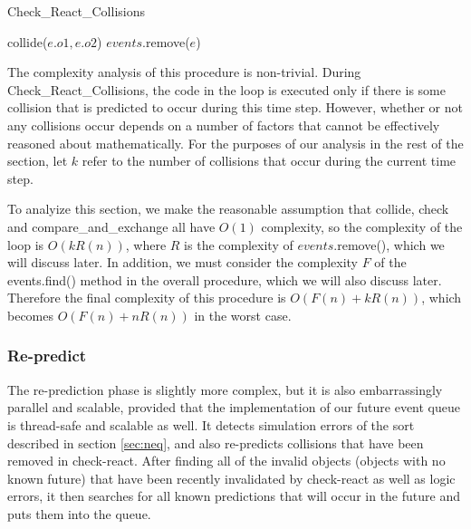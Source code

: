 \documentclass[CEJCS,PDF]{cej} %
\begin{document}
\begin{algorithm}
\caption{Check\_React\_Collisions}
\begin{algorithmic}
\STATE {}
	\STATE {}
		\STATE {}
			\STATE {}
			\STATE collide($e.o1,e.o2$)
		\ENDIF
		\STATE {}
		\STATE $events$.remove($e$)
	\ENDIF
\ENDFOR
\end{algorithmic}
\end{algorithm}

The complexity analysis of this procedure is non-trivial.  During Check\_React\_Collisions, the code in the loop is executed only if there is 
some collision that is predicted to occur during this time step.  However, whether or not any collisions occur depends on a number of factors that
cannot be effectively reasoned about mathematically. For the purposes of our analysis in the rest of the section, let $k$ refer to the number 
of collisions that occur during the current time step.  

To analyize this section, we make the reasonable assumption that collide, check and compare\_and\_exchange all have $O(1)$ complexity, so the complexity
of the loop is $O(k R(n))$, where $R$ is the complexity of $events$.remove(), which we will discuss later.  In addition, we must consider the complexity $F$
of the events.find() method in the overall procedure, which we will also discuss later.  Therefore the final complexity of this procedure is $O(F(n)+k R(n))$, which
becomes $O(F(n)+n R(n))$ in the worst case.

\subsubsection{Re-predict}
\label{sec:repredict}
The re-prediction phase is slightly more complex, but it is also embarrassingly parallel and scalable, provided that the implementation of our future event queue is thread-safe and scalable as well.  It detects simulation errors of the sort described in section \ref{sec:neq}, and also re-predicts collisions
that have been removed in check-react.  After finding all of the invalid objects (objects with no known future) that have been recently invalidated by check-react as well as logic errors, it then
searches for all known predictions that will occur in the future and puts them into the queue.  
\end{document}
